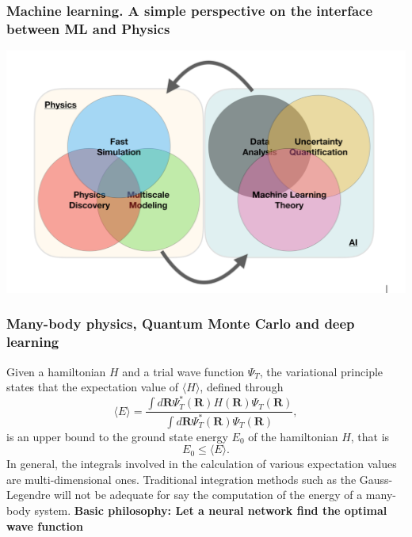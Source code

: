 \documentclass[11pt]{beamer} %
\begin{document}
\begin{frame}
\frametitle{Machine learning. A simple perspective on the interface between ML and Physics}

\vspace{6mm}

\centerline{\includegraphics[width=1.0\linewidth]{figures/mlimage.png}}

\vspace{6mm}
\end{frame}







\begin{frame}
\frametitle{Many-body physics, Quantum Monte Carlo and deep learning}

Given a hamiltonian $H$ and a trial wave function $\Psi_T$, the variational principle states that the expectation value of $\langle H \rangle$, defined through 
\[
   \langle E \rangle =
   \frac{\int d\mathbf{R}\Psi^{\ast}_T(\mathbf{R})H(\mathbf{R})\Psi_T(\mathbf{R})}
        {\int d\mathbf{R}\Psi^{\ast}_T(\mathbf{R})\Psi_T(\mathbf{R})},
\]
is an upper bound to the ground state energy $E_0$ of the hamiltonian $H$, that is 
\[
    E_0 \le \langle E \rangle.
\]
In general, the integrals involved in the calculation of various  expectation values  are multi-dimensional ones. Traditional integration methods such as the Gauss-Legendre will not be adequate for say the  computation of the energy of a many-body system.  \textbf{Basic philosophy: Let a neural network find the optimal wave function}
\end{frame}
\end{document}
